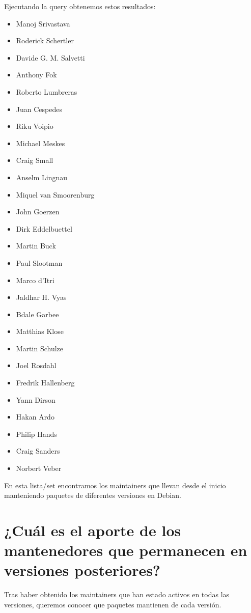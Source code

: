 \documentclass[a4paper, 12pt]{book}
\begin{document}
Ejecutando la query obtenemos estos resultados:
\begin{multicols}{3}
	\begin{itemize}
		\item Manoj Srivastava
		\item Roderick Schertler
		\item Davide G. M. Salvetti
		\item Anthony Fok
		\item Roberto Lumbreras
		\item Juan Cespedes
		\item Riku Voipio
		\item Michael Meskes
		\item Craig Small
		\item Anselm Lingnau
		\item Miquel van Smoorenburg
		\item John Goerzen
		\item Dirk Eddelbuettel
		\item Martin Buck
		\item Paul Slootman
		\item Marco d'Itri
		\item Jaldhar H. Vyas
		\item Bdale Garbee
		\item Matthias Klose
		\item Martin Schulze
		\item Joel Rosdahl
		\item Fredrik Hallenberg
		\item Yann Dirson
		\item Hakan Ardo
		\item Philip Hands
		\item Craig Sanders
		\item Norbert Veber
	\end{itemize}
\end{multicols}


En esta lista/set encontramos los maintainers que llevan desde el inicio manteniendo paquetes de diferentes versiones en Debian.

\section{¿Cuál es el aporte de los mantenedores que permanecen en versiones posteriores?}
\label{sec:pregunta_4}
Tras haber obtenido los maintainers que han estado activos en todas las versiones, queremos conocer que paquetes mantienen de cada versión.
\end{document}
